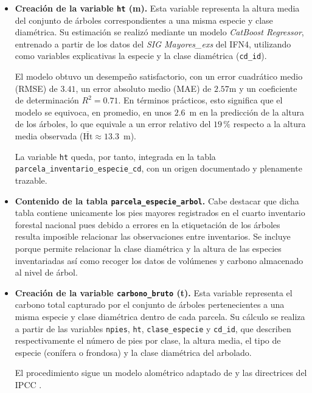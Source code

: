 \begin{itemize}
    \medskip

    \item \textbf{Creación de la variable \texttt{ht} (m).} Esta variable representa la altura media del conjunto de árboles correspondientes a una misma especie y clase diamétrica. Su estimación se realizó mediante un modelo \textit{CatBoost Regressor}, entrenado a partir de los datos del \textit{SIG Mayores\_exs} del IFN4, utilizando como variables explicativas la especie y la clase diamétrica (\texttt{cd\_id}).  

    \medskip

    El modelo obtuvo un desempeño satisfactorio, con un error cuadrático medio (RMSE) de $3.41$, un error absoluto medio (MAE) de $2.57$m y un coeficiente de determinación $R^2 = 0.71$. En términos prácticos, esto significa que el modelo se equivoca, en promedio, en unos $2.6$~m en la predicción de la altura de los árboles, lo que equivale a un error relativo del $19\,\%$ respecto a la altura media observada ($\overline{\text{Ht}} \approx 13.3$~m).
    
    \medskip

    La variable \texttt{ht} queda, por tanto, integrada en la tabla \texttt{parcela\_inventario\_especie\_cd}, con un origen documentado y plenamente trazable.

    \medskip

    \item \textbf{Contenido de la tabla \texttt{parcela\_especie\_arbol}.} Cabe destacar que dicha tabla contiene unicamente los pies mayores registrados en el cuarto inventario forestal nacional pues debido a errores en la etiquetación de los árboles resulta imposible relacionar las observaciones entre inventarios. Se incluye porque permite relacionar la clase diamétrica y la altura de las especies inventariadas así como recoger los datos de volúmenes y carbono almacenado al nivel de árbol. 

    \item \textbf{Creación de la variable \texttt{carbono\_bruto} (t).}  Esta variable representa el carbono total capturado por el conjunto de árboles pertenecientes a una misma especie y clase diamétrica dentro de cada parcela.  
    Su cálculo se realiza a partir de las variables \texttt{npies}, \texttt{ht}, \texttt{clase\_especie} y \texttt{cd\_id}, que describen respectivamente el número de pies por clase, la altura media, el tipo de especie (conífera o frondosa) y la clase diamétrica del arbolado.
    
    El procedimiento sigue un modelo alométrico adaptado de \cite{chave2014} y las directrices del IPCC \cite{ipcc2006}. 
    

\end{itemize}
